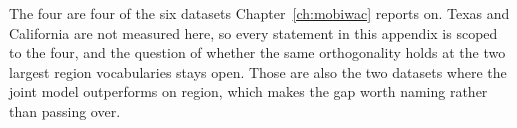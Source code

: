 The four are four of the six datasets Chapter~\ref{ch:mobiwac} reports on. Texas and California are
not measured here, so every statement in this appendix is scoped to the four, and the question of
whether the same orthogonality holds at the two largest region vocabularies stays open. Those are
also the two datasets where the joint model outperforms on region, which makes the gap worth naming
rather than passing over.
